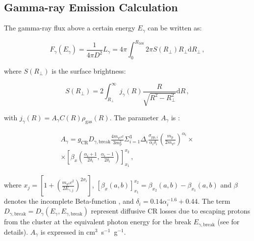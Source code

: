 \documentclass[traditabstract]{aa}
\newcommand{\rmn}{\mathrm}
\begin{document}
\begin{appendix}

\section{Gamma-ray Emission Calculation}
\label{app:C}

The gamma-ray flux above a certain energy $E_{\gamma}$ can be written as:

\begin{equation}
F_{\gamma} (E_{\gamma}) = \frac{1}{4\pi D^{2}} L_{\gamma} = 4\pi \int_{0}^{R_{500}} 2\pi S(R_{\perp}) R_{\perp} \rmn{d}R_{\perp} \, ,
\end{equation}

where $S(R_{\perp})$ is the surface brightness:

\begin{equation}
S(R_{\perp}) = 2 \int_{R_{\perp}}^{\infty} j_{\gamma}(R) \frac{R}{\sqrt{R^{2}-R_{\perp}^{2}}} \rmn{d}R \, ,
\end{equation}

with $ j_{\gamma}(R)=A_{\gamma} C(R) \rho_{\rmn{gas}}(R)$. The parameter $A_{\gamma}$ is \citep{2010MNRAS.409..449P}:

\begin{eqnarray}
A_{\gamma} = g_{\rmn{CR}} D_{\gamma,\rmn{break}} \frac{4 m_{\pi^{0}} c}{3 m_{\rmn{p}}^{2}} \Sigma_{i=1}^{3} \Delta_{i} \frac{\sigma_{\rmn{pp},i}}{\alpha_{i} \delta_{i}} \left( \frac{m_{\rmn{p}}}{2 m_{\pi^{0}}} \right)^{\alpha_{i}} \times \nonumber \\
\times \left[ \beta_{x} \left( \frac{\alpha_{i}+1}{2\delta_{i}}, \frac{\alpha_{i}-1}{2\delta_{i}} \right) \right]_{x_{1}}^{x_{2}} \, ,
\end{eqnarray}

where $x_{j}=\left[ 1 + \left( \frac{m_{\pi^{0}}c^2}{2E_{\gamma,j}} \right)^{2\sigma_{i}} \right]$, $\left[ \beta_{x}(a,b) \right]_{x_1}^{x_2} = \beta_{x_2}(a,b)-\beta_{x_1}(a,b)$ and $\beta$ denotes the incomplete Beta-function \citep{1965hmfw.book.....A}, and $\delta_{i}=0.14\alpha_{i}^{-1.6}+0.44$. The term $D_{\gamma, \rmn{break}}=D_{\gamma}(E_{\gamma},E_{\gamma,\rmn{break}})$ represent diffusive CR losses due to escaping protons from the cluster at the equivalent photon energy for the break $E_{\gamma, \rmn{break}}$ (see \citealp{2010MNRAS.409..449P} for details). $A_{\gamma}$ is expressed in cm$^3$~s$^{-1}$~g$^{-1}$. 




\end{appendix}
\end{document}
